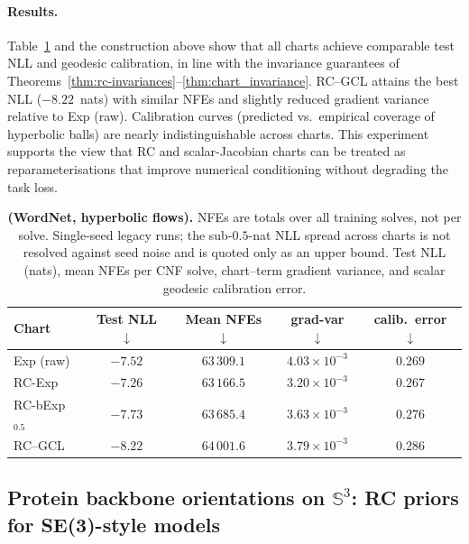 \documentclass{article}
\theoremstyle{definition}
\theoremstyle{remark}
\newcommand{\SSS}{\mathbb{S}}
\begin{document}
\paragraph{Results.}
Table~\ref{tab:E4_wordnet} and the construction above show that all
charts achieve comparable test NLL and geodesic calibration, in line with
the invariance guarantees of
Theorems~\ref{thm:rc-invariances}--\ref{thm:chart_invariance}.
RC--GCL attains the best NLL ($-8.22$~nats) with similar NFEs and
slightly reduced gradient variance relative to Exp (raw).
Calibration curves (predicted vs.\ empirical coverage of hyperbolic
balls) are nearly indistinguishable across charts.
This experiment supports the view that RC and scalar-Jacobian charts can
be treated as reparameterisations that improve numerical conditioning
without degrading the task loss.

\begin{table}[H]
  \centering
  \caption{\textbf{(WordNet, hyperbolic flows).} NFEs are totals over all training solves, not per solve. Single-seed legacy runs; the sub-$0.5$-nat NLL spread across charts is not resolved against seed noise and is quoted only as an upper bound.
  Test NLL (nats), mean NFEs per CNF solve, chart–term gradient variance,
  and scalar geodesic calibration error.}
  \label{tab:E4_wordnet}
  \begin{tabular}{lcccc}
    \toprule
    Chart & Test NLL $\downarrow$ & Mean NFEs $\downarrow$ & grad-var $\downarrow$ & calib.\ error $\downarrow$ \\
    \midrule
    Exp (raw)        & $-7.52$ & $63\,309.1$ & $4.03\times 10^{-3}$ & $0.269$ \\
    RC-Exp          & $-7.26$ & $63\,166.5$ & $3.20\times 10^{-3}$ & $0.267$ \\
    RC-bExp$_{0.5}$ & $-7.73$ & $63\,685.4$ & $3.63\times 10^{-3}$ & $0.276$ \\
    RC--GCL          & $-8.22$ & $64\,001.6$ & $3.79\times 10^{-3}$ & $0.286$ \\
    \bottomrule
  \end{tabular}
\end{table}



\subsection{Protein backbone orientations on $\SSS^3$: RC priors for SE(3)-style models}
\label{exp:E7_protein}
\end{document}
